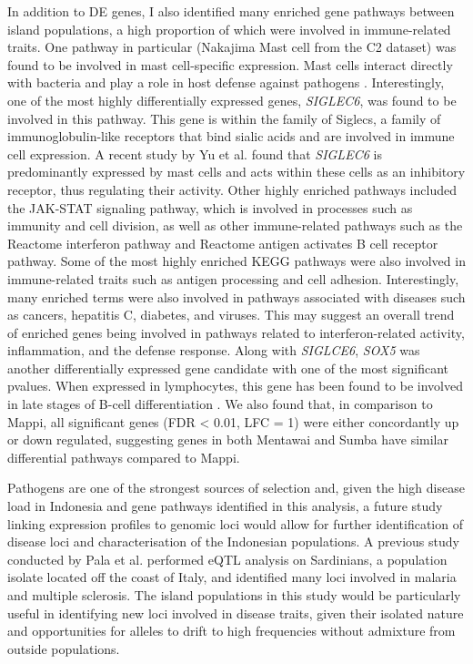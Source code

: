 \documentclass[12pt,a4paper,titlepage,twoside,openright]{book}
\begin{document}
\begin{mainmatter}
{{In addition to DE genes, I also identified many enriched gene pathways between island populations, a high proportion of which were involved in immune-related traits. One pathway in particular (Nakajima Mast cell from the C2 dataset) was found to be involved in mast cell-specific expression. Mast cells interact directly with bacteria and play a role in host defense against pathogens \cite{amin2012role}. Interestingly, one of the most highly differentially expressed genes, \textit{SIGLEC6}, was found to be involved in this pathway. This gene is within the family of Siglecs, a family of immunoglobulin-like receptors that bind sialic acids and are involved in immune cell expression. A recent study by Yu et al. \cite{yu2018functional} found that \textit{SIGLEC6} is predominantly expressed by mast cells and acts within these cells as an inhibitory receptor, thus regulating their activity. Other highly enriched pathways included the JAK-STAT signaling pathway, which is involved in processes such as immunity and cell division, as well as other immune-related pathways such as the Reactome interferon pathway and Reactome antigen activates B cell receptor pathway. Some of the most highly enriched KEGG pathways were also involved in immune-related traits such as antigen processing and cell adhesion. Interestingly, many enriched terms were also involved in pathways associated with diseases such as cancers, hepatitis C, diabetes, and viruses. This may suggest an overall trend of enriched genes being involved in pathways related to interferon-related activity, inflammation, and the defense response. Along with \textit{SIGLCE6}, \textit{SOX5} was another differentially expressed gene candidate with one of the most significant pvalues. When expressed in lymphocytes, this gene has been found to be involved in late stages of B-cell differentiation \cite{rakhmanov2014high}. We also found that, in comparison to Mappi, all significant genes (FDR < 0.01, LFC = 1) were either concordantly up or down regulated, suggesting genes in both Mentawai and Sumba have similar differential pathways compared to Mappi. 

Pathogens are one of the strongest sources of selection and, given the high disease load in Indonesia and gene pathways identified in this analysis, a future study linking expression profiles to genomic loci would allow for further identification of disease loci and characterisation of the Indonesian populations. A previous study conducted by Pala et al. \cite{pala2017population} performed eQTL analysis on Sardinians, a population isolate located off the coast of Italy, and identified many loci involved in malaria and multiple sclerosis. The island populations in this study would be particularly useful in identifying new loci involved in disease traits, given their isolated nature and opportunities for alleles to drift to high frequencies without admixture from outside populations. 

}}
\end{mainmatter}
\end{document}
